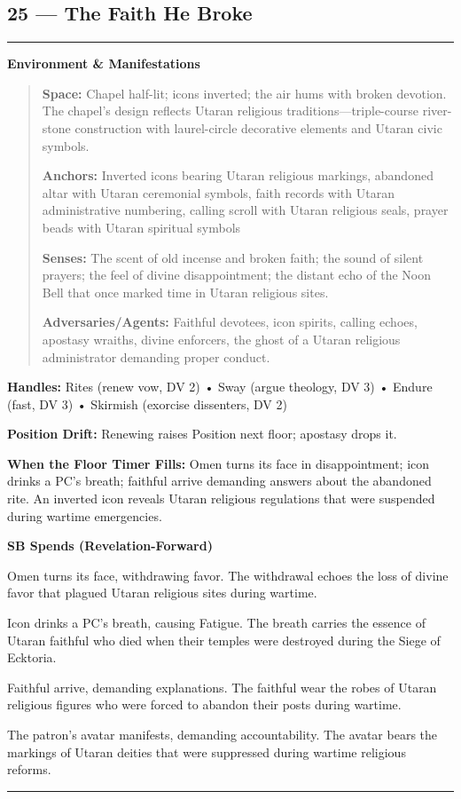 \documentclass[18pt, letterpaper, twoside]{article}
\newenvironment{floorbox}[1]{%
    \begin{center}
    \begin{minipage}{0.95\textwidth}
    \subsection*{#1}
    \vspace{-0.5em}
    \rule{\textwidth}{0.5pt}
    \vspace{0.5em}
}{%
    \vspace{0.5em}
    \rule{\textwidth}{0.5pt}
    \end{minipage}
    \end{center}
}
\newenvironment{gmnote}[1]{%
    \vspace{0.5em}
    \noindent\textbf{#1}
    \begin{quote}
}{%
    \end{quote}
    \vspace{0.5em}
}
\newcommand{\handles}[1]{\noindent\textbf{Handles:} #1\par}
\newcommand{\sbitem}[2]{\item[#1 SB:] #2}
\begin{document}
\begin{floorbox}{25 --- The Faith He Broke}
\begin{gmnote}{Environment \& Manifestations}
\textbf{Space:} Chapel half-lit; icons inverted; the air hums with broken devotion. The chapel's design reflects Utaran religious traditions---triple-course river-stone construction with laurel-circle decorative elements and Utaran civic symbols.

\textbf{Anchors:} Inverted icons bearing Utaran religious markings, abandoned altar with Utaran ceremonial symbols, faith records with Utaran administrative numbering, calling scroll with Utaran religious seals, prayer beads with Utaran spiritual symbols

\textbf{Senses:} The scent of old incense and broken faith; the sound of silent prayers; the feel of divine disappointment; the distant echo of the Noon Bell that once marked time in Utaran religious sites.

\textbf{Adversaries/Agents:} Faithful devotees, icon spirits, calling echoes, apostasy wraiths, divine enforcers, the ghost of a Utaran religious administrator demanding proper conduct.
\end{gmnote}

\handles{Rites (renew vow, DV 2) • Sway (argue theology, DV 3) • Endure (fast, DV 3) • Skirmish (exorcise dissenters, DV 2)}

\textbf{Position Drift:} Renewing raises Position next floor; apostasy drops it.

\textbf{When the Floor Timer Fills:} Omen turns its face in disappointment; icon drinks a PC's breath; faithful arrive demanding answers about the abandoned rite. An inverted icon reveals Utaran religious regulations that were suspended during wartime emergencies.

\textbf{SB Spends (Revelation-Forward)}
\begin{description}[leftmargin=*, style=unboxed]
    \sbitem{1}{Omen turns its face, withdrawing favor. The withdrawal echoes the loss of divine favor that plagued Utaran religious sites during wartime.}
    \sbitem{2}{Icon drinks a PC's breath, causing Fatigue. The breath carries the essence of Utaran faithful who died when their temples were destroyed during the Siege of Ecktoria.}
    \sbitem{3}{Faithful arrive, demanding explanations. The faithful wear the robes of Utaran religious figures who were forced to abandon their posts during wartime.}
    \sbitem{4+}{The patron's avatar manifests, demanding accountability. The avatar bears the markings of Utaran deities that were suppressed during wartime religious reforms.}
\end{description}


\end{floorbox}
\end{document}

